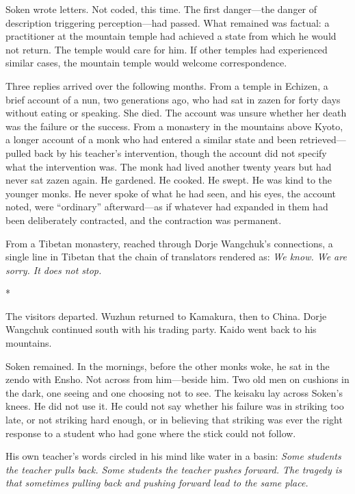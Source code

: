 Soken wrote letters. Not coded, this time. The first danger---the danger of description triggering perception---had passed. What remained was factual: a practitioner at the mountain temple had achieved a state from which he would not return. The temple would care for him. If other temples had experienced similar cases, the mountain temple would welcome correspondence.

Three replies arrived over the following months. From a temple in Echizen, a brief account of a nun, two generations ago, who had sat in zazen for forty days without eating or speaking. She died. The account was unsure whether her death was the failure or the success. From a monastery in the mountains above Kyoto, a longer account of a monk who had entered a similar state and been retrieved---pulled back by his teacher's intervention, though the account did not specify what the intervention was. The monk had lived another twenty years but had never sat zazen again. He gardened. He cooked. He swept. He was kind to the younger monks. He never spoke of what he had seen, and his eyes, the account noted, were ``ordinary'' afterward---as if whatever had expanded in them had been deliberately contracted, and the contraction was permanent.

From a Tibetan monastery, reached through Dorje Wangchuk's connections, a single line in Tibetan that the chain of translators rendered as: \emph{We know. We are sorry. It does not stop.}

\begin{center}
*\quad*\quad*
\end{center}

The visitors departed. Wuzhun returned to Kamakura, then to China. Dorje Wangchuk continued south with his trading party. Kaido went back to his mountains.

Soken remained. In the mornings, before the other monks woke, he sat in the zendo with Ensho. Not across from him---beside him. Two old men on cushions in the dark, one seeing and one choosing not to see. The keisaku lay across Soken's knees. He did not use it. He could not say whether his failure was in striking too late, or not striking hard enough, or in believing that striking was ever the right response to a student who had gone where the stick could not follow.

His own teacher's words circled in his mind like water in a basin: \emph{Some students the teacher pulls back. Some students the teacher pushes forward. The tragedy is that sometimes pulling back and pushing forward lead to the same place.}

